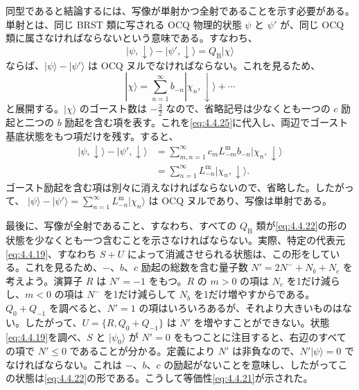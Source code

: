 同型であると結論するには、写像が単射かつ全射であることを示す必要がある。単射とは、同じ BRST 類に写される OCQ 物理的状態 $\psi$ と $\psi'$ が、同じ OCQ 類に属さなければならないという意味である。すなわち、
\begin{equation}
|\psi,\downarrow\rangle-|\psi',\downarrow\rangle=Q_{\mathrm B}|\chi\rangle
\tag{4.4.25}\label{eq:4.4.25}
\end{equation}
ならば、$|\psi\rangle-|\psi'\rangle$ は OCQ ヌルでなければならない。これを見るため、
\begin{equation}
|\chi\rangle=\sum_{n=1}^{\infty}b_{-n}|\chi_n,\downarrow\rangle+\cdots
\tag{4.4.26}\label{eq:4.4.26}
\end{equation}
と展開する。$|\chi\rangle$ のゴースト数は $-\tfrac32$ なので、省略記号は少なくとも一つの $c$ 励起と二つの $b$ 励起を含む項を表す。これを\eqref{eq:4.4.25}に代入し、両辺でゴースト基底状態をもつ項だけを残す。すると、
\begin{equation}
\begin{aligned}
|\psi,\downarrow\rangle-|\psi',\downarrow\rangle
&=\sum_{m,n=1}^{\infty}c_mL^{\mathrm m}_{-m}b_{-n}|\chi_n,\downarrow\rangle\\
&=\sum_{n=1}^{\infty}L^{\mathrm m}_{-n}|\chi_n,\downarrow\rangle .
\end{aligned}
\tag{4.4.27}\label{eq:4.4.27}
\end{equation}
ゴースト励起を含む項は別々に消えなければならないので、省略した。したがって、
$|\psi\rangle-|\psi'\rangle
=\sum_{n=1}^{\infty}L^{\mathrm m}_{-n}|\chi_n\rangle$
は OCQ ヌルであり、写像は単射である。

最後に、写像が全射であること、すなわち、すべての $Q_{\mathrm B}$ 類が\eqref{eq:4.4.22}の形の状態を少なくとも一つ含むことを示さなければならない。実際、特定の代表元\eqref{eq:4.4.19}、すなわち $S+U$ によって消滅させられる状態は、この形をしている。これを見るため、$-$、$b$、$c$ 励起の総数を含む量子数 $N'=2N^-+N_b+N_c$ を考えよう。演算子 $R$ は $N'=-1$ をもつ。$R$ の $m>0$ の項は $N_c$ を1だけ減らし、$m<0$ の項は $N^-$ を1だけ減らして $N_b$ を1だけ増やすからである。$Q_0+Q_{-1}$ を調べると、$N'=1$ の項はいろいろあるが、それより大きいものはない。したがって、$U=\{R,Q_0+Q_{-1}\}$ は $N'$ を増やすことができない。状態\eqref{eq:4.4.19}を調べ、$S$ と $|\psi_0\rangle$ が $N'=0$ をもつことに注目すると、右辺のすべての項で $N'\leq0$ であることが分かる。定義により $N'$ は非負なので、$N'|\psi\rangle=0$ でなければならない。これは $-$、$b$、$c$ の励起がないことを意味し、したがってこの状態は\eqref{eq:4.4.22}の形である。こうして等価性\eqref{eq:4.4.21}が示された。

